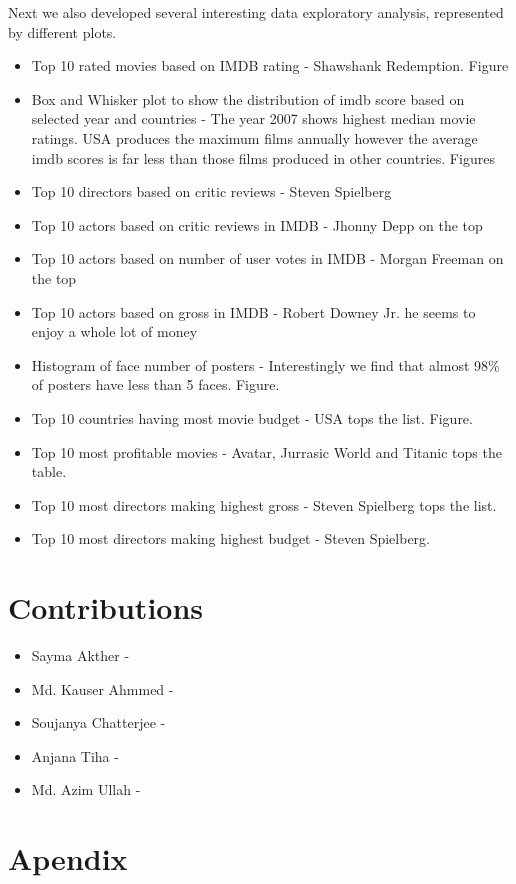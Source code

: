 \documentclass{article}%
\begin{document}
Next we also developed several interesting data exploratory analysis, represented by different plots. 

\begin{itemize}
\item Top 10 rated movies based on IMDB rating - Shawshank Redemption. Figure 
\item Box and Whisker plot to show the distribution of imdb score based on selected year and countries - The year 2007 shows highest median movie ratings. USA produces the maximum films annually however the average imdb scores is far less than those films produced in other countries. Figures
\item Top 10 directors based on critic reviews - Steven Spielberg
\item Top 10 actors based on critic reviews  in IMDB - Jhonny Depp on the top
\item Top 10 actors based on number of user votes in IMDB - Morgan Freeman on the top
\item Top 10 actors based on gross in IMDB - Robert Downey Jr. he seems to enjoy a whole lot of money
\item Histogram of face number of posters - Interestingly we find that almost 98\% of posters have less than 5 faces. Figure.
\item Top 10 countries having most movie budget - USA tops the list. Figure.
\item Top 10 most profitable movies - Avatar, Jurrasic World and Titanic tops the table.
\item Top 10 most directors making highest gross - Steven Spielberg tops the list.
\item Top 10 most directors making highest budget - Steven Spielberg.
\end{itemize}

\section{Contributions}

\begin{itemize}
\item Sayma Akther - 
\item Md. Kauser Ahmmed - 
\item Soujanya Chatterjee - 
\item Anjana Tiha - 
\item Md. Azim Ullah -
\end{itemize}

\section{Apendix}
\end{document}
